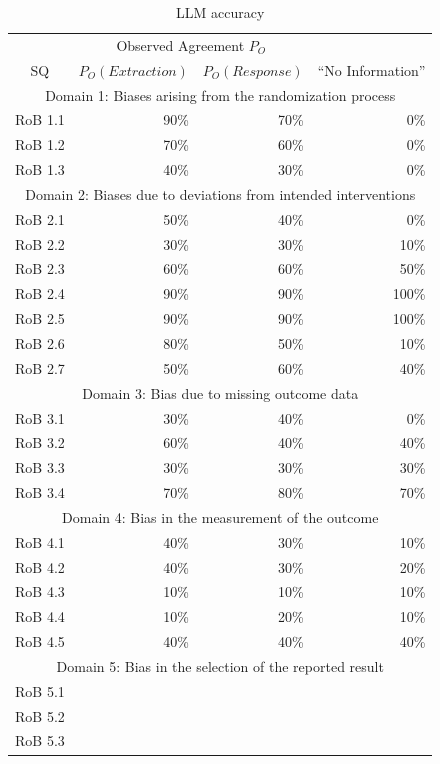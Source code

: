 \documentclass[sn-mathphys,Numbered]{sn-jnl}%
\theoremstyle{thmstyleone}%
\theoremstyle{thmstyletwo}%
\theoremstyle{thmstylethree}%
\begin{document}
\begin{table}[htb]
    \caption{LLM accuracy}
    \label{table:LLM_eval}
    \centering
    \begin{tabular}{crrr}
    \toprule[1.0pt]
     & \multicolumn{2}{c}{Observed Agreement $P_{O}$} \\
        SQ & $P_{O} (Extraction)$ & $P_{O} (Response)$ & ``No Information'' \\ 
    \midrule[1.0pt]
        \multicolumn{4}{c}{Domain 1: Biases arising from the randomization process} \\
        \hline
        RoB 1.1 & 90\% & 70\% & 0\% \\ 
        RoB 1.2 & 70\% & 60\% & 0\% \\ 
        RoB 1.3 & 40\% & 30\% & 0\% \\ 
        \hline
        \multicolumn{4}{c}{Domain 2: Biases due to deviations from intended interventions} \\
        \hline
        RoB 2.1 & 50\% & 40\% & 0\% \\
        RoB 2.2 & 30\% & 30\% & 10\% \\ 
        RoB 2.3 & 60\% & 60\% & 50\% \\ 
        RoB 2.4 & 90\% & 90\% & 100\% \\ 
        RoB 2.5 & 90\% & 90\% & 100\% \\ 
        RoB 2.6 & 80\% & 50\% & 10\% \\ 
        RoB 2.7 & 50\% & 60\% & 40\% \\
        \hline
        \multicolumn{4}{c}{Domain 3: Bias due to missing outcome data} \\
        \hline
        RoB 3.1 & 30\% & 40\% & 0\% \\ 
        RoB 3.2 & 60\% & 40\% & 40\% \\ 
        RoB 3.3 & 30\% & 30\% & 30\% \\ 
        RoB 3.4 & 70\% & 80\% & 70\% \\ 
        \hline
        \multicolumn{4}{c}{Domain 4: Bias in the measurement of the outcome} \\
        \hline
        RoB 4.1 & 40\% & 30\% & 10\% \\ 
        RoB 4.2 & 40\% & 30\% & 20\% \\ 
        RoB 4.3 & 10\% & 10\% & 10\% \\ 
        RoB 4.4 & 10\% & 20\% & 10\% \\ 
        RoB 4.5 & 40\% & 40\% & 40\% \\
        \hline
        \multicolumn{4}{c}{Domain 5: Bias in the selection of the reported result} \\
        \hline
        RoB 5.1 & & & \\ 
        RoB 5.2 & & & \\ 
        RoB 5.3 & & & \\
    \bottomrule[1.0pt]
    \end{tabular}
\end{table}
%
%
%
\end{document}
